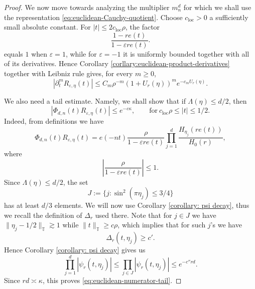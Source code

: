 \documentclass{article}
\newcommand{\T}{\mathbb T}
\theoremstyle{plain}
\numberwithin{equation}{section}
\begin{document}
\begin{proof}
We now move towards analyzing the multiplier $m_n^d$ for which we shall use the representation
\eqref{eq:euclidean-Cauchy-quotient}.
Choose $c_{\mathrm{loc}}>0$ a sufficiently small absolute constant.
For \(|t|\leq 2c_{\mathrm{loc}}\rho\), the factor
\[
 \frac{1-re(t)}{1-\varepsilon re(t)}.
\]
equals \(1\) when \(\varepsilon=1\), while for \(\varepsilon=-1\)
it is uniformly bounded together with all of its derivatives.  Hence
Corollary \ref{corllary:euclidean-product-derivatives} together with Leibniz rule gives, for every \(m\geq0\),
\begin{equation*}
 |\partial_t^mR_{\varepsilon,\eta}(t)|
 \leq
 C_m\rho^{-m}
 (1+U_r(\eta))^m e^{-c_mU_r(\eta)}.
\end{equation*}

We also need a tail estimate. Namely, we shall show that if \(\Lambda(\eta)\leq d/2\), then
\begin{equation}\label{eq:euclidean-numerator-tail}
 |\Phi_{d,n}(t)R_{\varepsilon,\eta}(t)|
 \leq e^{-c\kappa},
 \qquad
\text{for} \  c_{\mathrm{loc}}\rho\leq |t|\leq 1/2.
\end{equation}
Indeed, from definitions we have
\[
 \Phi_{d,n}(t)R_{\varepsilon,\eta}(t)
 =
 e(-nt)\frac{\rho}{1-\varepsilon re(t)}
 \prod_{j=1}^d
 \frac{H_{\eta_j}(re(t))}{H_0(r)},
\]
where
\[
 \left|\frac{\rho}{1-\varepsilon re(t)}\right|\leq1.
\]
Since
\(\Lambda(\eta)\leq d/2\), the set
\[
 J:=\{j:\sin^2(\pi\eta_j)\leq3/4\}
\]
has at least \(d/3\) elements. We will now use Corollary \ref{corollary: psi decay}, thus we recall the definition of $\Delta_r$ used there. Note that  for \(j\in J\) we have $\|\eta_j -1/2\|_{\T} \gtrsim 1$ while $\|t \|_{\T} \ge c\rho$, which implies that for such $j$'s we have
\[
\Delta_r(t,\eta_j) \ge c'.
\]
Hence Corollary \ref{corollary: psi decay} gives us
\[
 \prod_{j=1}^d
 |\psi_r(t,\eta_j)|
 \leq\prod_{j\in J}
 |\psi_r(t,\eta_j)| \le e^{-c''rd}.
\]
Since \(rd\asymp\kappa\), this proves
\eqref{eq:euclidean-numerator-tail}.


\end{proof}
\end{document}
